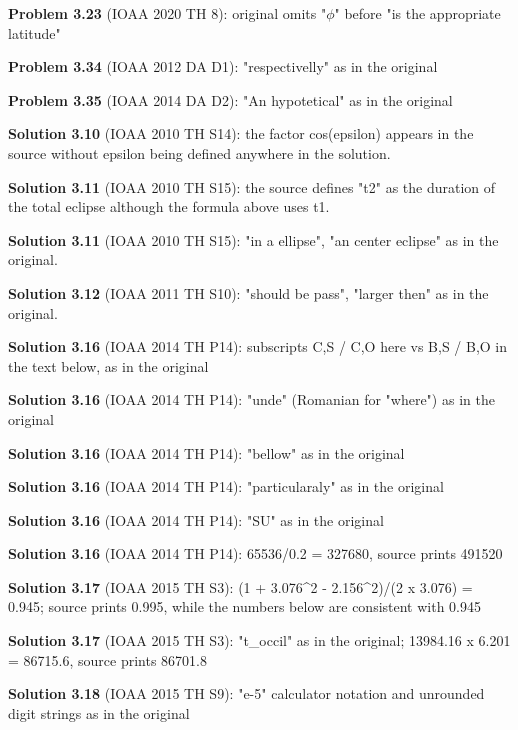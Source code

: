 \noindent\textbf{Problem 3.23} (IOAA 2020 TH 8): original omits "$\phi$" before "is the appropriate latitude"
\smallskip

\noindent\textbf{Problem 3.34} (IOAA 2012 DA D1): "respectivelly" as in the original
\smallskip

\noindent\textbf{Problem 3.35} (IOAA 2014 DA D2): "An hypotetical" as in the original
\smallskip

\noindent\textbf{Solution 3.10} (IOAA 2010 TH S14): the factor cos(epsilon) appears in the source without epsilon being defined anywhere in the solution.
\smallskip

\noindent\textbf{Solution 3.11} (IOAA 2010 TH S15): the source defines "t2" as the duration of the total eclipse although the formula above uses t1.
\smallskip

\noindent\textbf{Solution 3.11} (IOAA 2010 TH S15): "in a ellipse", "an center eclipse" as in the original.
\smallskip

\noindent\textbf{Solution 3.12} (IOAA 2011 TH S10): "should be pass", "larger then" as in the original.
\smallskip

\noindent\textbf{Solution 3.16} (IOAA 2014 TH P14): subscripts C,S / C,O here vs B,S / B,O in the text below, as in the original
\smallskip

\noindent\textbf{Solution 3.16} (IOAA 2014 TH P14): "unde" (Romanian for "where") as in the original
\smallskip

\noindent\textbf{Solution 3.16} (IOAA 2014 TH P14): "bellow" as in the original
\smallskip

\noindent\textbf{Solution 3.16} (IOAA 2014 TH P14): "particularaly" as in the original
\smallskip

\noindent\textbf{Solution 3.16} (IOAA 2014 TH P14): "SU" as in the original
\smallskip

\noindent\textbf{Solution 3.16} (IOAA 2014 TH P14): 65536/0.2 = 327680, source prints 491520
\smallskip

\noindent\textbf{Solution 3.17} (IOAA 2015 TH S3): (1 + 3.076\^{}2 - 2.156\^{}2)/(2 x 3.076) = 0.945; source prints 0.995, while the numbers below are consistent with 0.945
\smallskip

\noindent\textbf{Solution 3.17} (IOAA 2015 TH S3): "t\_occil" as in the original; 13984.16 x 6.201 = 86715.6, source prints 86701.8
\smallskip

\noindent\textbf{Solution 3.18} (IOAA 2015 TH S9): "e-5" calculator notation and unrounded digit strings as in the original
\smallskip

